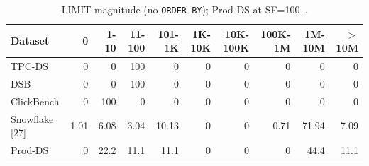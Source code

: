 \begin{table}[t]
  \centering
  \caption{LIMIT magnitude (no \texttt{ORDER BY}); Prod-DS at SF=100~\cite{snowflake}.}
  \label{tab:limit-magnitude}
  \begin{tabular}{lrrrrrrrrr}
    \toprule
    Dataset & 0 & 1-10 & 11-100 & 101-1K & 1K-10K & 10K-100K & 100K-1M & 1M-10M & $>$10M \\
    \midrule
    TPC-DS & 0 & 0 & 100 & 0 & 0 & 0 & 0 & 0 & 0 \\
    DSB & 0 & 0 & 100 & 0 & 0 & 0 & 0 & 0 & 0 \\
    ClickBench & 0 & 100 & 0 & 0 & 0 & 0 & 0 & 0 & 0 \\
    Snowflake [27] & 1.01 & 6.08 & 3.04 & 10.13 & 0 & 0 & 0.71 & 71.94 & 7.09 \\
    Prod-DS & 0 & 22.2 & 11.1 & 11.1 & 0 & 0 & 0 & 44.4 & 11.1 \\
    \bottomrule
  \end{tabular}
\end{table}
